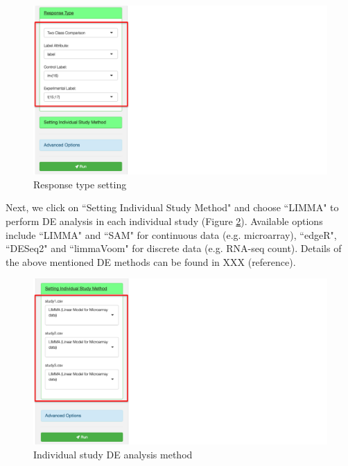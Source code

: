 \begin{figure}[H]
\begin{center}
\includegraphics[scale=0.45]{./figure/metaDE/ResponseType}
\caption{Response type setting}
\label{fig:ResponseType}
\end{center}
\end{figure}

Next, we click on ``Setting Individual Study Method" and choose ``LIMMA" to perform DE analysis in each individual study (Figure \ref{fig:IndDE}). Available options include ``LIMMA" and ``SAM" for continuous data (e.g. microarray), ``edgeR", ``DESeq2" and ``limmaVoom" for discrete data (e.g. RNA-seq count). Details of the above mentioned DE methods can be found in XXX (reference).

\begin{figure}[H]
\begin{center}
\includegraphics[scale=0.45]{./figure/metaDE/IndDE}
\caption{Individual study DE analysis method}
\label{fig:IndDE}
\end{center}
\end{figure}

